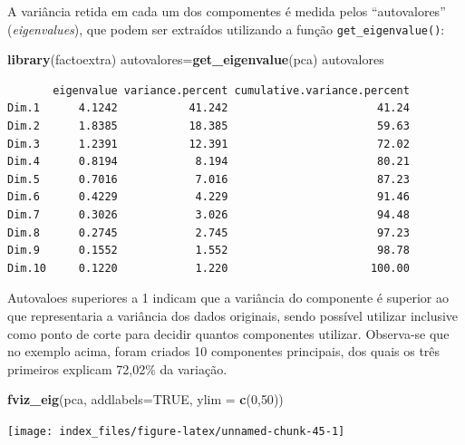 \documentclass[12pt,brazil,oneside]{book}
\newenvironment{Shaded}{\begin{snugshade}}{\end{snugshade}}
\newcommand{\DataTypeTok}[1]{\textcolor[rgb]{0.13,0.29,0.53}{#1}}
\newcommand{\DecValTok}[1]{\textcolor[rgb]{0.00,0.00,0.81}{#1}}
\newcommand{\KeywordTok}[1]{\textcolor[rgb]{0.13,0.29,0.53}{\textbf{#1}}}
\newcommand{\NormalTok}[1]{#1}
\newcommand{\OperatorTok}[1]{\textcolor[rgb]{0.81,0.36,0.00}{\textbf{#1}}}
\newcommand{\OtherTok}[1]{\textcolor[rgb]{0.56,0.35,0.01}{#1}}
\begin{document}
A variância retida em cada um dos compomentes é medida pelos ``autovalores'' (\emph{eigenvalues}), que podem ser extraídos utilizando a função \texttt{get\_eigenvalue()}:

\begin{Shaded}
\begin{Highlighting}[]
\KeywordTok{library}\NormalTok{(factoextra)}
\NormalTok{autovalores=}\KeywordTok{get_eigenvalue}\NormalTok{(pca)}
\NormalTok{autovalores}
\end{Highlighting}
\end{Shaded}

\begin{verbatim}
       eigenvalue variance.percent cumulative.variance.percent
Dim.1      4.1242           41.242                       41.24
Dim.2      1.8385           18.385                       59.63
Dim.3      1.2391           12.391                       72.02
Dim.4      0.8194            8.194                       80.21
Dim.5      0.7016            7.016                       87.23
Dim.6      0.4229            4.229                       91.46
Dim.7      0.3026            3.026                       94.48
Dim.8      0.2745            2.745                       97.23
Dim.9      0.1552            1.552                       98.78
Dim.10     0.1220            1.220                      100.00
\end{verbatim}

Autovaloes superiores a 1 indicam que a variância do componente é superior ao que representaria a variância dos dados originais, sendo possível utilizar inclusive como ponto de corte para decidir quantos componentes utilizar. Observa-se que no exemplo acima, foram criados 10 componentes principais, dos quais os três primeiros explicam 72,02\% da variação.

\begin{Shaded}
\begin{Highlighting}[]
\KeywordTok{fviz_eig}\NormalTok{(pca, }\DataTypeTok{addlabels=}\OtherTok{TRUE}\NormalTok{, }\DataTypeTok{ylim =} \KeywordTok{c}\NormalTok{(}\DecValTok{0}\NormalTok{,}\DecValTok{50}\NormalTok{))}
\end{Highlighting}
\end{Shaded}

\begin{center}\texttt{[image: index\_files/figure-latex/unnamed-chunk-45-1]} \end{center}

\begin{Shaded}
\end{Shaded}
\end{document}
